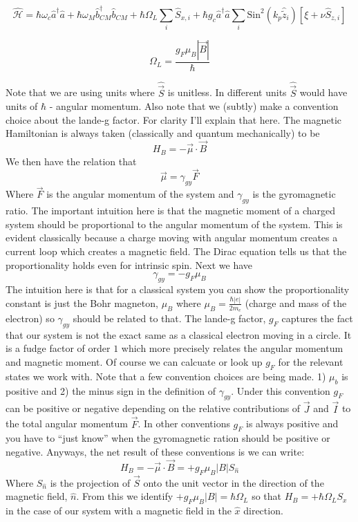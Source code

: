 \documentclass[12pt]{article}
\begin{document}
\begin{equation}
 \widehat{\mathcal{H}} = 
\hbar \omega_c \hat{a}^{\dag} \hat{a} 
+ \hbar \omega_M \hat{b}^{\dag}_{CM} \hat{b}_{CM} 
+ \hbar \Omega_L \sum_i \hat{S}_{x,i} 
+ \hbar g_c \hat{a}^{\dag} \hat{a} \sum_i \text{Sin}^2(k_p \hat{\tilde{z}}_i) \left[ \xi + \nu \hat{S}_{z,i} \right]     
\end{equation}

\[\Omega_L = \frac{g_F \mu_B |\vec{B}|}{\hbar}\] 

Note that we are using units where $\hat{\vec{S}}$ is unitless. In different units $\hat{\vec{S}}$ would have units of $\hbar$ - angular momentum. Also note that we (subtly) make a convention choice about the lande-g factor. For clarity I'll explain that here. The magnetic Hamiltonian is always taken (classically and quantum mechanically) to be
\[H_B = - \vec{\mu}\cdot\vec{B} \]
We then have the relation that
\[\vec{\mu} = \gamma_{gy} \vec{F}\]
Where $\vec{F}$ is the angular momentum of the system and $\gamma_{gy}$ is the gyromagnetic ratio. The important intuition here is that the magnetic moment of a charged system should be proportional to the angular momentum of the system. This is evident classically because a charge moving with angular momentum creates a current loop which creates a magnetic field. The Dirac equation tells us that the proportionality holds even for intrinsic spin. Next we have
\[\gamma_{gy} = -g_F \mu_B\]
The intuition here is that for a classical system you can show the proportionality constant is just the Bohr magneton, $\mu_B$ where $\mu_B = \frac{\hbar |e|}{2 m_e}$ (charge and mass of the electron) so $\gamma_{gy}$ should be related to that. The lande-g factor, $g_F$ captures the fact that our system is not the exact same as a classical electron moving in a circle. It is a fudge factor of order $1$ which more precisely relates the angular momentum and magnetic moment. Of course we can calcuate or look up $g_F$ for the relevant states we work with. Note that a few convention choices are being made. 1) $\mu_b$ is positive and 2) the minus sign in the definition of $\gamma_{gy}$. Under this convention $g_F$ can be positive or negative depending on the relative contributions of $\vec{J}$ and $\vec{I}$ to the total angular momentum $\vec{F}$. In other conventions $g_F$ is always positive and you have to ``just know'' when the gyromagnetic ration should be positive or  negative. Anyways, the net result of these conventions is we can write:
\[H_B = -\vec{\mu}\cdot \vec{B} = + g_F \mu_B |B| S_{\hat{n}}\]
Where $S_{\hat{n}}$ is the projection of $\vec{S}$ onto the unit vector in the direction of the magnetic field, $\hat{n}$. From this we identify $+g_F \mu_B |B| = \hbar{\Omega_L}$ so that $H_B = +\hbar \Omega_L S_x$ in the case of our system with a magnetic field in the $\hat{x}$ direction.
\end{document}
